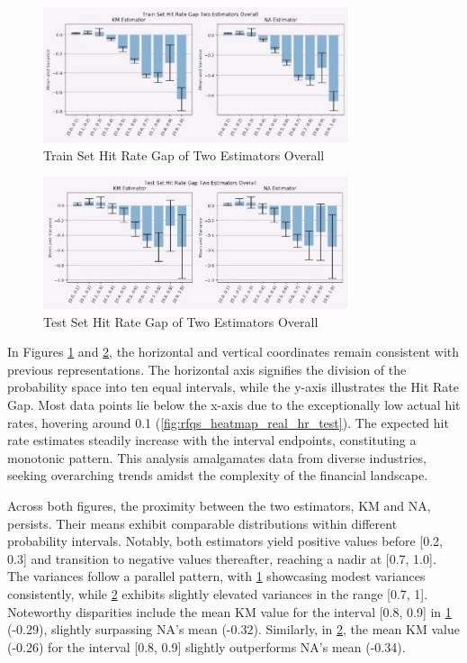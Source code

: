 \begin{figure}[H]
    \centering
    \includegraphics[width=0.8\textwidth]{figures/jpm/11. Train Set Hit Rate Gap Two Estimators Overall.png}
    \caption{Train Set Hit Rate Gap of Two Estimators Overall}
    \label{fig:train_hit_rate_gap_overall}
\end{figure}

\begin{figure}[H]
    \centering
    \includegraphics[width=0.8\textwidth]{figures/jpm/13. Test Set Hit Rate Gap Two Estimators Overall.png}
    \caption{Test Set Hit Rate Gap of Two Estimators Overall}
    \label{fig:test_hit_rate_gap_overall}
\end{figure}

In Figures \ref{fig:train_hit_rate_gap_overall} and \ref{fig:test_hit_rate_gap_overall}, the horizontal and vertical coordinates remain consistent with previous representations. The horizontal axis signifies the division of the probability space into ten equal intervals, while the y-axis illustrates the Hit Rate Gap. Most data points lie below the x-axis due to the exceptionally low actual hit rates, hovering around 0.1 (\ref{fig:rfqs_heatmap_real_hr_test}). The expected hit rate estimates steadily increase with the interval endpoints, constituting a monotonic pattern. This analysis amalgamates data from diverse industries, seeking overarching trends amidst the complexity of the financial landscape.

Across both figures, the proximity between the two estimators, KM and NA, persists. Their means exhibit comparable distributions within different probability intervals. Notably, both estimators yield positive values before [0.2, 0.3] and transition to negative values thereafter, reaching a nadir at [0.7, 1.0]. The variances follow a parallel pattern, with \ref{fig:train_hit_rate_gap_overall} showcasing modest variances consistently, while \ref{fig:test_hit_rate_gap_overall} exhibits slightly elevated variances in the range [0.7, 1]. Noteworthy disparities include the mean KM value for the interval [0.8, 0.9] in \ref{fig:train_hit_rate_gap_overall} (-0.29), slightly surpassing NA's mean (-0.32). Similarly, in \ref{fig:test_hit_rate_gap_overall}, the mean KM value (-0.26) for the interval [0.8, 0.9] slightly outperforms NA's mean (-0.34).

